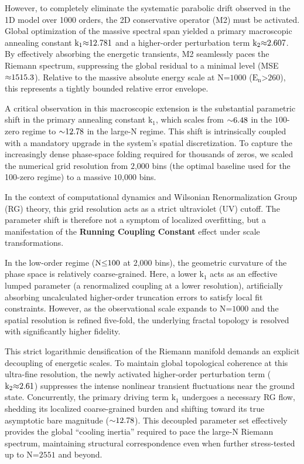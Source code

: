 \documentclass[fractalfract,article,submit,oneauthor,pdftex]{Definitions/mdpi}
\begin{document}
However, to completely eliminate the systematic parabolic drift observed
in the 1D model over 1000 orders, the 2D conservative operator (M2) must
be activated. Global optimization of the massive spectral span yielded a
primary macroscopic annealing constant
\(\text{k}_{\text{1}}\text{\ensuremath{\approx}12.781}\) and a higher-order perturbation
term \(\text{k}_{\text{2}}\text{\ensuremath{\approx}2.607}\). By effectively absorbing the
energetic transients, M2 seamlessly paces the Riemann spectrum,
suppressing the global residual to a minimal level (MSE
\(\text{\ensuremath{\approx}1515.3}\)). Relative to the massive absolute energy scale at
\(\text{N}\text{=1000}\) (\(\text{E}_{\text{n}}\text{>260}\)), this
represents a tightly bounded relative error envelope.

A critical observation in this macroscopic extension is the substantial
parametric shift in the primary annealing constant
\(\text{k}_{\text{1}}\), which scales from \(\text{\ensuremath{\sim}6.48}\) in the
\(\text{100}\)-zero regime to \(\text{\ensuremath{\sim}12.78}\) in the large-N
regime. This shift is intrinsically coupled with a mandatory upgrade in
the system's spatial discretization. To capture the increasingly dense
phase-space folding required for thousands of zeros, we scaled the
numerical grid resolution from \(\text{2,000}\) bins (the optimal
baseline used for the 100-zero regime) to a massive \(\text{10,000}\)
bins.

In the context of computational dynamics and Wilsonian Renormalization
Group (RG) theory, this grid resolution acts as a strict ultraviolet
(UV) cutoff. The parameter shift is therefore not a symptom of localized
overfitting, but a manifestation of the \textbf{Running
Coupling Constant} effect under scale transformations.

In the low-order regime (\(\text{N}\text{\ensuremath{\le}100}\) at \(\text{2,000}\)
bins), the geometric curvature of the phase space is relatively
coarse-grained. Here, a lower \(\text{k}_{\text{1}}\) acts as an
effective lumped parameter (a renormalized coupling at a lower
resolution), artificially absorbing uncalculated higher-order truncation
errors to satisfy local fit constraints. However, as the observational
scale expands to \(\text{N}\text{=1000}\) and the spatial resolution is
refined five-fold, the underlying fractal topology is resolved with
significantly higher fidelity.

This strict logarithmic densification of the Riemann manifold demands an
explicit decoupling of energetic scales. To maintain global topological
coherence at this ultra-fine resolution, the newly activated
higher-order perturbation term (\(\text{k}_{\text{2}}\text{\ensuremath{\approx}2.61}\))
suppresses the intense nonlinear transient fluctuations near the ground
state. Concurrently, the primary driving term \(\text{k}_{\text{1}}\)
undergoes a necessary RG flow, shedding its localized coarse-grained
burden and shifting toward its true asymptotic bare magnitude
(\(\text{\ensuremath{\sim}12.78}\)). This decoupled parameter set effectively provides
the global ``cooling inertia'' required to pace the large-N
Riemann spectrum, maintaining structural correspondence even when further
stress-tested up to \(\text{N}\text{=2551}\) and beyond.
\end{document}
